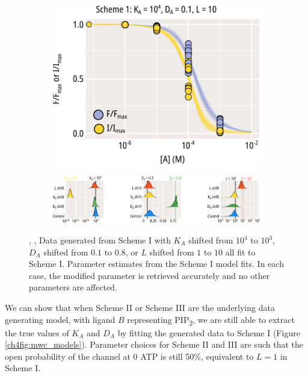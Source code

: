 \begin{figure}[hbtp]
\begin{subfigure}[t]{0.3\textwidth}
		\caption{}\label{ch4fig:scheme_1_l_shift}
		\centering
		\includegraphics[width=\textwidth]{mwc_scheme_1_l_shift.pdf}
	\end{subfigure}
	\vfill
	\begin{subfigure}[t]{0.9\textwidth}
		\caption{}\label{ch4fig:mwc_params_2}
		\centering
		\includegraphics[width=\textwidth]{mwc_scheme_param_fits_2.pdf}
	\end{subfigure}
	\caption[Parameter retrieval from MWC models - simple scheme]{
	{\bf{}}
	, ,  Data generated from Scheme I with  $K_A$ shifted from $10^4$ to $10^3$,  $D_A$ shifted from $0.1$ to $0.8$, or  $L$ shifted from $1$ to $10$ all fit to Scheme I.
	 Parameter estimates from the Scheme I model fits.
	In each case, the modified parameter is retrieved accurately and no other parameters are affected.
	}\label{ch4fig:scheme_1_shifts}
\end{figure}

We can show that when Scheme II or Scheme III are the underlying data generating model, with ligand $B$ representing PIP\textsubscript{2}, we are still able to extract the true values of $K_A$ and $D_A$ by fitting the generated data to Scheme I (Figure \ref{ch4fig:mwc_models}).
Parameter choices for Scheme II and III are such that the open probability of the channel at \SI{0}{\Molar} ATP is still 50\%, equivalent to $L=1$ in Scheme I.

